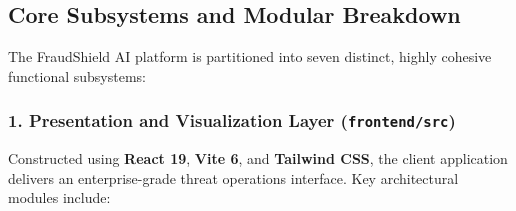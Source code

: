 \documentclass[12pt,a4paper,oneside]{report}
\begin{document}
\subsection{Core Subsystems and Modular Breakdown}

The FraudShield AI platform is partitioned into seven distinct, highly cohesive functional subsystems:


\subsubsection{1. Presentation and Visualization Layer (\texttt{frontend/src})}
Constructed using \textbf{React 19}, \textbf{Vite 6}, and \textbf{Tailwind CSS}, the client application delivers an enterprise-grade threat operations interface. Key architectural modules include:
\end{document}
